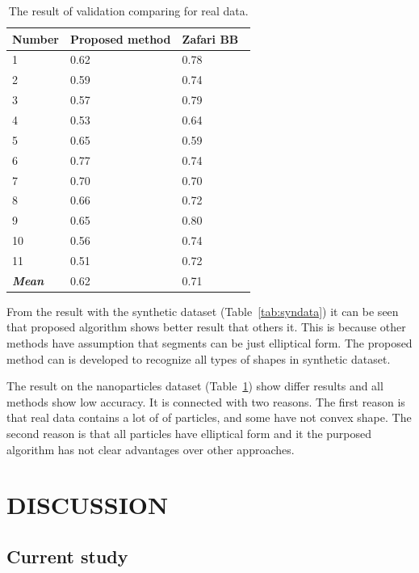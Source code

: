\documentclass{lutmscthesis}[2010/09/22]
\begin{document}
\begin{table}[hpt]
\begin{center}
\caption{The result of validation comparing for real data.\label{tab:realdata}}
\begin{tabular}{ |p{2cm}||p{3cm}|p{3cm}|  }
 \hline
 Number & Proposed method & Zafari BB~\cite{zafari-bb}\\
 \hline
 1   &  0.62&  0.78\\
 2   &  0.59&  0.74\\
 3   &  0.57&  0.79\\
 4   &  0.53&  0.64\\
 5   &  0.65&  0.59\\
 6   &  0.77&  0.74\\
 7   &  0.70&  0.70\\
 8   &  0.66&  0.72\\
 9   &  0.65&  0.80\\
 10  &  0.56&  0.74\\
 11  &  0.51&  0.72\\
 \hline
 \textbf{\textit{Mean}} & 0.62 & 0.71\\
 \hline
\end{tabular}
\end{center}
\end{table}

From the result with the synthetic dataset (Table~\ref{tab:syndata}) it can be seen that
proposed algorithm shows better result that others it. This is because other methods have assumption that segments can be just elliptical form. The proposed method can is developed to recognize all types of shapes in synthetic dataset.


The result on the nanoparticles dataset (Table~\ref{tab:realdata}) show differ results and
all methods show low accuracy. It is connected with two reasons. The first reason is that real data contains a lot of of particles, and some have not convex shape. The second reason is that all particles have elliptical form and it the purposed algorithm has not clear advantages over other approaches. 
\section{DISCUSSION}
\label{sec:discussion}

\subsection{Current study}
\end{document}
